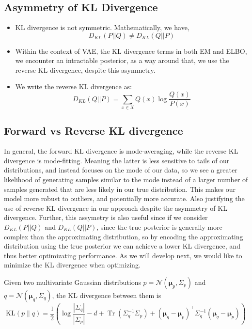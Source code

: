 \subsection{Asymmetry of KL Divergence}
\begin{itemize}
    \item KL divergence is not symmetric. Mathematically, we have, 
    \begin{equation}
    D_{KL}(P || Q) \neq D_{KL}(Q || P) 
    \end{equation}
    \item Within the context of VAE, the KL divergence terms in both EM and ELBO, we encounter an intractable posterior, as a way around that, we use the reverse KL divergence, despite this asymmetry.
    \item We write the reverse KL divergence as:
    \begin{equation}
    D_{KL}(Q || P) = \sum_{x \in X} Q(x) \log \frac{Q(x)}{P(x)}
    \end{equation}
\end{itemize}
\subsection{Forward vs Reverse KL divergence}
In general, the forward KL divergence is mode-averaging, while the reverse KL divergence is mode-fitting. Meaning the latter is less sensitive to tails of our distributions, and instead focuses on the mode of our data, so we see a greater likelihood of generating samples similar to the mode instead of a larger number of samples generated that are less likely in our true distribution. This makes our model more robust to outliers, and potentially more accurate. Also justifying the use of reverse KL divergence in our approach despite the asymmetry of KL divergence. 
Further, this assymetry is also useful since if we consider $D_{KL}(P||Q)$ and $D_{KL}(Q||P)$, since the true posterior is generally more complex than the approximating distribution, so by encoding the approximating distribution using the true posterior we can achieve a lower KL divergence, and thus better optimizating performance. As we will develop next, we would like to minimize the KL divergence when optimizing. 

\begin{theorem}
    Given two multivariate Gaussian distributions $p=\mathcal{N}(\boldsymbol{\mu}_p,\Sigma_p)$ and $q=\mathcal{N}(\boldsymbol{\mu}_q,\Sigma_q)$, the KL divergence between them is
    \[
    \mathrm{KL}(p\|q) = \frac{1}{2} \left( \log\frac{|\Sigma_q|}{|\Sigma_p|} - d + \operatorname{Tr}(\Sigma_q^{-1}\Sigma_p) + (\boldsymbol{\mu}_q - \boldsymbol{\mu}_p)^\top \Sigma_q^{-1} (\boldsymbol{\mu}_q - \boldsymbol{\mu}_p) \right)
    \]
\end{theorem}

